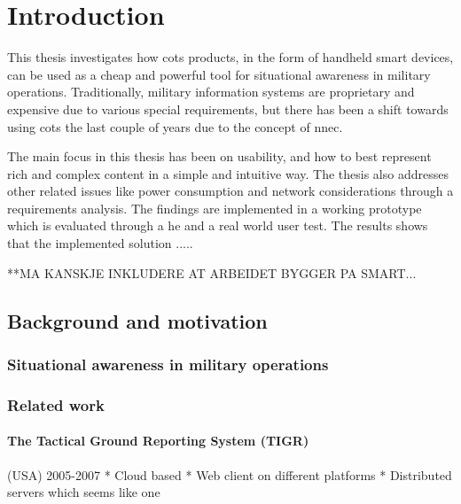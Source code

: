\chapter{Introduction}
This thesis investigates how \gls{cots} products, in the form of handheld smart devices, can be used as a cheap and powerful tool for situational awareness in military operations. Traditionally, military information systems are proprietary and expensive due to various special requirements, but there has been a shift towards using \gls{cots} the last couple of years due to the concept of \gls{nnec}.

The main focus in this thesis has been on usability, and how to best represent rich and complex content in a simple and intuitive way. The thesis also addresses other related issues like power consumption and network considerations through a requirements analysis. The findings are implemented in a working prototype which is evaluated through a \gls{he} and a real world user test. The results shows that the implemented solution .....

**MA KANSKJE INKLUDERE AT ARBEIDET BYGGER PA SMART...




\section{Background and motivation}
\subsection{Situational awareness in military operations}

\subsection{Related work}
\subsubsection{The Tactical Ground Reporting System (TIGR)}
(USA) 2005-2007
* Cloud based
* Web client on different platforms
* Distributed servers which seems like one
\cite{04-Evans-tigr}\cite{04-Ewy-tigr_iraq}

